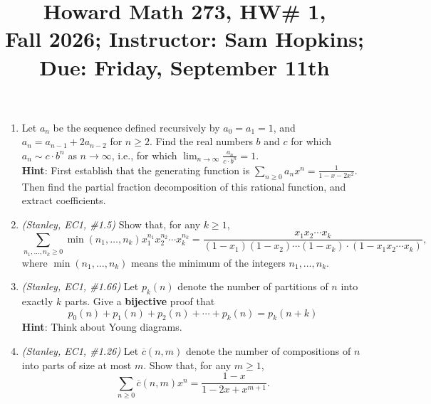 \documentclass[11pt]{article}
\title{Howard Math 273, HW\# 1, \\ {\normalsize Fall 2026; Instructor: Sam Hopkins; Due: Friday, September 11th}}
\date{}
\begin{document}
\maketitle

\thispagestyle{empty}

\begin{enumerate}

\item Let $a_n$ be the sequence defined recursively by $a_0=a_1=1$, and $a_n = a_{n-1}+2a_{n-2}$ for $n \geq 2$. Find the real numbers $b$ and $c$ for which $a_n \sim c \cdot b^n$ as $n \to \infty$, i.e., for which $\displaystyle \lim_{n \to \infty} \frac{a_n}{c \cdot b^n} = 1$. \\{\bf Hint}: First establish that the generating function is $\displaystyle \sum_{n\geq 0} a_nx^n = \frac{1}{1-x-2x^2}$. Then find the partial fraction decomposition of this rational function, and extract coefficients.

\item \emph{(Stanley, EC1, \#1.5)} Show that, for any $k \geq 1$,
\[ \sum_{n_1,\ldots, n_k \geq 0} \min(n_1,\ldots,n_k) x_1^{n_1}x_2^{n_2}\cdots x_k^{n_k} = \frac{x_1x_2\cdots x_k}{(1-x_1)(1-x_2)\cdots(1-x_k) \cdot (1-x_1x_2\cdots x_k)}, \]
where $ \min(n_1,\ldots,n_k)$ means the minimum of the integers $n_1,\ldots,n_k$.

\item \emph{(Stanley, EC1, \#1.66)} Let $p_k(n)$ denote the number of partitions of $n$ into exactly $k$ parts. Give a {\bf bijective} proof that
\[p_0(n)+p_1(n)+p_2(n)+\cdots + p_k(n) = p_k(n+k)\]
{\bf Hint}: Think about Young diagrams.

\item \emph{(Stanley, EC1, \#1.26)} Let $\overline{c}(n,m)$ denote the number of compositions of $n$ into parts of size at most $m$. Show that, for any $m \geq 1$,
\[ \sum_{n\geq 0} \overline{c}(n,m)x^n = \frac{1-x}{1-2x+x^{m+1}}.\]


\end{enumerate}
\end{document}

